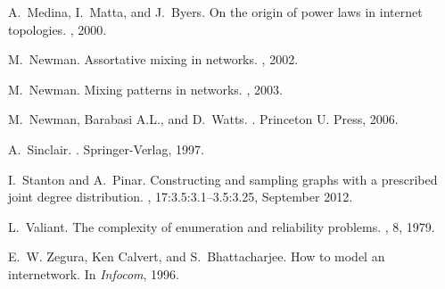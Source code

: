 \documentclass[12pt,a4paper]{article}
\theoremstyle{definition}
\theoremstyle{plain}
\begin{document}
\begin{thebibliography}{10}
A.~Medina, I.~Matta, and J.~Byers.
\newblock On the origin of power laws in internet topologies.
, 2000.

M.~Newman.
\newblock Assortative mixing in networks.
, 2002.

M.~Newman.
\newblock Mixing patterns in networks.
, 2003.

M.~Newman, Barabasi A.L., and D.~Watts.
.
\newblock Princeton U. Press, 2006.

A.~Sinclair.
.
\newblock Springer-Verlag, 1997.

I.~Stanton and A.~Pinar.
\newblock Constructing and sampling graphs with a prescribed joint degree
  distribution.
, 17:3.5:3.1--3.5:3.25, September 2012.

L.~Valiant.
\newblock The complexity of enumeration and reliability problems.
, 8, 1979.

E.~W. Zegura, Ken Calvert, and S.~Bhattacharjee.
\newblock How to model an internetwork.
\newblock In {\em Infocom}, 1996.


\end{thebibliography}
\end{document}
